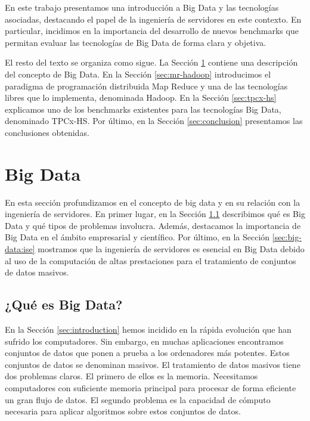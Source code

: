 \documentclass[10pt]{article}
\begin{document}
	En este trabajo presentamos una introducción a Big Data y las tecnologías asociadas, destacando el papel de la ingeniería de servidores en este contexto. En particular, incidimos en la importancia del desarrollo de nuevos benchmarks que permitan evaluar las tecnologías de Big Data de forma clara y objetiva.

	El resto del texto se organiza como sigue. La Sección \ref{sec:big-data} contiene una descripción del concepto de Big Data. En la Sección \ref{sec:mr-hadoop} introducimos el paradigma de programación distribuida Map Reduce y una de las tecnologías libres que lo implementa, denominada Hadoop. En la Sección \ref{sec:tpcx-hs} explicamos uno de los benchmarks existentes para las tecnologías Big Data, denominado TPCx-HS. Por último, en la Sección \ref{sec:conclusion} presentamos las conclusiones obtenidas.

\section{Big Data} \label{sec:big-data}
	
	En esta sección profundizamos en el concepto de big data y en su relación con la ingeniería de servidores. En primer lugar, en la Sección \ref{sec:big-data:que-es} describimos qué es Big Data y qué tipos de problemas involucra. Además, destacamos la importancia de Big Data en el ámbito empresarial y científico. Por último, en la Sección \ref{sec:big-data:ise} mostramos que la ingeniería de servidores es esencial en Big Data debido al uso de la computación de altas prestaciones para el tratamiento de conjuntos de datos masivos.

	\subsection{¿Qué es Big Data?} \label{sec:big-data:que-es}
	
		En la Sección \ref{sec:introduction} hemos incidido en la rápida evolución que han sufrido los computadores. Sin embargo, en muchas aplicaciones encontramos conjuntos de datos que ponen a prueba a los ordenadores más potentes. Estos conjuntos de datos se denominan masivos. El tratamiento de datos masivos tiene dos problemas claros. El primero de ellos es la memoria. Necesitamos computadores con suficiente memoria principal para procesar de forma eficiente un gran flujo de datos. El segundo problema es la capacidad de cómputo necesaria para aplicar algoritmos sobre estos conjuntos de datos. 
		
\end{document}
